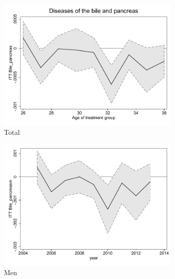 \documentclass[a4paper ]{article}
\begin{document}
\begin{figure}[h!]
	\centering
	\begin{subfigure}[t]{0.31\textwidth}
		\centering
		\includegraphics[width=0.99\textwidth]{R1_LC_Bile_pancreas}
		\caption{Total}		
	\end{subfigure}
	\begin{subfigure}[t]{0.31\textwidth}
		\centering
		\includegraphics[width=0.99\textwidth]{R1_LC_Bile_pancreasm}
		\caption{Men}		
	\end{subfigure}
	\quad
	\begin{subfigure}[t]{0.31\textwidth}
		\centering

\end{subfigure}
\end{figure}
\end{document}
